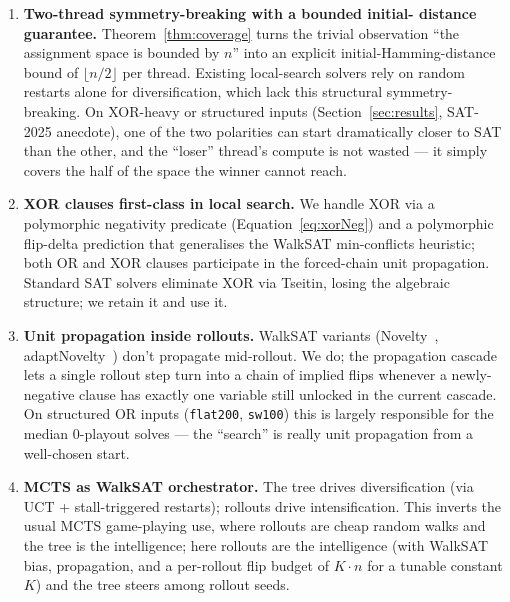 \documentclass[11pt]{article}
\begin{document}
\begin{enumerate}\itemsep0pt

\item \textbf{Two-thread symmetry-breaking with a bounded initial-
distance guarantee.} Theorem~\ref{thm:coverage} turns the trivial
observation ``the assignment space is bounded by $n$'' into an
explicit initial-Hamming-distance bound of $\lfloor n/2 \rfloor$
per thread. Existing local-search solvers rely on random restarts
alone for diversification, which lack this structural symmetry-
breaking. On XOR-heavy or structured inputs
(Section~\ref{sec:results}, SAT-2025 anecdote), one of the two
polarities can start dramatically closer to SAT than the other, and
the ``loser'' thread's compute is not wasted — it simply covers the
half of the space the winner cannot reach.

\item \textbf{XOR clauses first-class in local search.} We handle XOR
via a polymorphic negativity predicate
(Equation~\ref{eq:xorNeg}) and a polymorphic flip-delta prediction
that generalises the WalkSAT
min-conflicts heuristic; both OR and XOR clauses participate in the
forced-chain unit propagation. Standard SAT solvers eliminate XOR
via Tseitin, losing the algebraic structure; we retain it and use it.

\item \textbf{Unit propagation inside rollouts.} WalkSAT variants
(Novelty~\cite{selman:walksat}, adaptNovelty~\cite{hoos:novelty})
don't propagate mid-rollout. We do; the propagation cascade lets a
single rollout step turn into a chain of implied flips whenever a
newly-negative clause has exactly one variable still unlocked in the
current cascade. On structured OR inputs (\texttt{flat200},
\texttt{sw100}) this is largely responsible for the median 0-playout
solves — the ``search'' is really unit propagation from a well-chosen
start.

\item \textbf{MCTS as WalkSAT orchestrator.} The tree drives
diversification (via UCT + stall-triggered restarts); rollouts
drive intensification. This inverts the usual MCTS
game-playing use, where rollouts are cheap random walks and the
tree is the intelligence; here rollouts are the intelligence (with
WalkSAT bias, propagation, and a per-rollout flip budget of
$K \cdot n$ for a tunable constant $K$) and the tree steers among
rollout seeds.

\end{enumerate}
\end{document}

